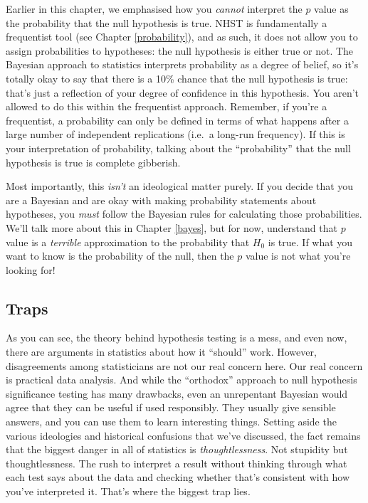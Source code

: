 \documentclass[
  11pt,
  a4paper,
  twoside,symmetric,openright]{book}
\theoremstyle{break}
\theoremstyle{break}
\begin{document}
Earlier in this chapter, we emphasised how you \emph{cannot} interpret the \(p\) value as the probability that the null hypothesis is true. NHST is fundamentally a frequentist tool (see Chapter \ref{probability}), and as such, it does not allow you to assign probabilities to hypotheses: the null hypothesis is either true or not. The Bayesian approach to statistics interprets probability as a degree of belief, so it's totally okay to say that there is a 10\% chance that the null hypothesis is true: that's just a reflection of your degree of confidence in this hypothesis. You aren't allowed to do this within the frequentist approach. Remember, if you're a frequentist, a probability can only be defined in terms of what happens after a large number of independent replications (i.e.~a long-run frequency). If this is your interpretation of probability, talking about the ``probability'' that the null hypothesis is true is complete gibberish.

Most importantly, this \emph{isn't} an ideological matter purely. If you decide that you are a Bayesian and are okay with making probability statements about hypotheses, you \emph{must} follow the Bayesian rules for calculating those probabilities. We'll talk more about this in Chapter \ref{bayes}, but for now, understand that \(p\) value is a \emph{terrible} approximation to the probability that \(H_0\) is true. If what you want to know is the probability of the null, then the \(p\) value is not what you're looking for!

\subsection{Traps}\label{traps}

As you can see, the theory behind hypothesis testing is a mess, and even now, there are arguments in statistics about how it ``should'' work. However, disagreements among statisticians are not our real concern here. Our real concern is practical data analysis. And while the ``orthodox'' approach to null hypothesis significance testing has many drawbacks, even an unrepentant Bayesian would agree that they can be useful if used responsibly. They usually give sensible answers, and you can use them to learn interesting things. Setting aside the various ideologies and historical confusions that we've discussed, the fact remains that the biggest danger in all of statistics is \emph{thoughtlessness}. Not stupidity but thoughtlessness. The rush to interpret a result without thinking through what each test says about the data and checking whether that's consistent with how you've interpreted it. That's where the biggest trap lies.
\end{document}
